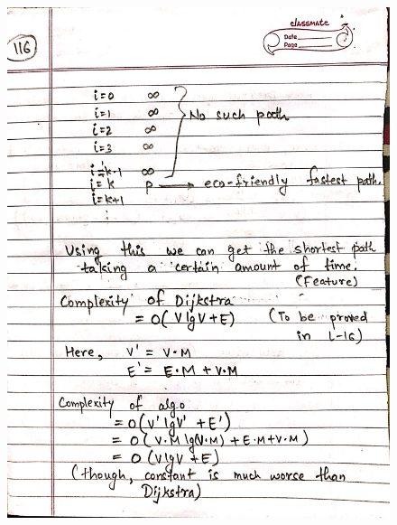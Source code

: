 \begin{figure}[H]
    \centering
    \includegraphics[scale=0.25]{"./MIT-6.006/MIT-6006-116"}
\end{figure}
\newpage
